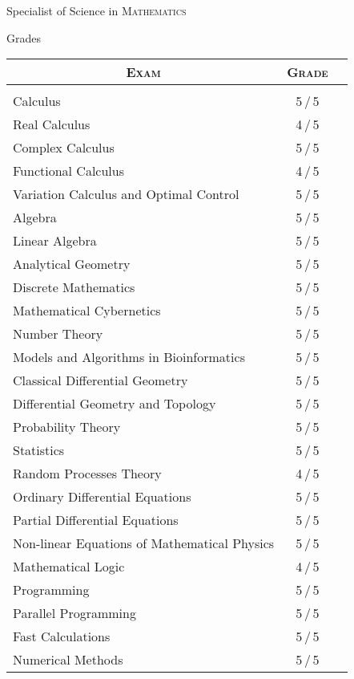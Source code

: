 \documentclass[a4paper,10pt]{article}
\begin{document}
\newpage
\par{\centering\Large \hypertarget{grds}{Specialist of Science in \textsc{Mathematics}}\par}\large{\centering Grades\par}\normalsize
\begin{center}
\begin{tabular}{lcc}
\multicolumn{1}{c}{\textsc{Exam}}&\textsc{Grade}\\ 
\hline\\
Calculus	& 5\,/\,5 \\
Real Calculus &4\,/\,5 \\
Complex Calculus &5\,/\,5 \\
Functional Calculus &4\,/\,5 \\
Variation Calculus and Optimal Control &5\,/\,5 \\

Algebra	        & 5\,/\,5 \\
Linear Algebra & 5\,/\,5 \\
Analytical Geometry &5\,/\,5 \\

Discrete Mathematics &5\,/\,5\\
Mathematical Cybernetics &5\,/\,5 \\
Number Theory &5\,/\,5 \\
Models and Algorithms in Bioinformatics & 5\,/\,5 \\

Classical Differential Geometry &5\,/\,5 \\
Differential Geometry and Topology&5\,/\,5 \\

Probability Theory &5\,/\,5 \\
Statistics &5\,/\,5 \\
Random Processes Theory &4\,/\,5 \\

Ordinary Differential Equations &5\,/\,5 \\
Partial Differential Equations &5\,/\,5 \\
Non-linear Equations of Mathematical Physics &5\,/\,5 \\

Mathematical Logic &4\,/\,5 \\

Programming &5\,/\,5 \\
Parallel Programming &5\,/\,5 \\
Fast Calculations &5\,/\,5 \\
Numerical Methods &5\,/\,5 \\


\end{tabular}
\end{center}
\end{document}
